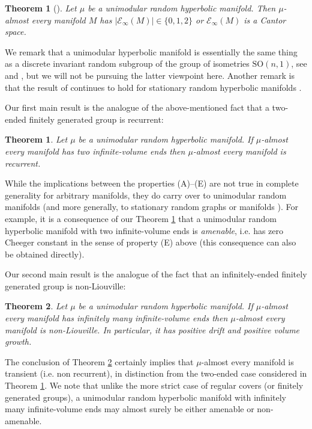 \documentclass{amsart}
\newcommand{\EndsInf}[1]{\mathcal{E}_{\infty}\left(#1\right)}
\theoremstyle{plain}
\newtheorem{theorem}{Theorem}[section]
\newtheorem*{theorem*}{Theorem}
\numberwithin{equation}{section}
\theoremstyle{definition}
\begin{document}
\begin{theorem*}[\cite{biringer2017ends}]
\label{thm:Biringer--Raimbault}
Let $\mu$ be a unimodular random hyperbolic manifold. Then $\mu$-almost every manifold $M$ has $|\EndsInf{M}| \in \{0,1,2\}$ or $\EndsInf{M}$ is a Cantor space.
\end{theorem*}

We remark that a unimodular hyperbolic manifold is essentially the same thing as a discrete invariant random subgroup of the group of isometries $\mathrm{SO}(n,1)$, see \cite[Theorem 1.4]{biringer2017unimodularity} and \cite[Theorem 2.8]{abert2022unimodular}, but we will not be pursuing the latter viewpoint here. Another remark is that the result of \cite{biringer2017ends} continues to hold for stationary random hyperbolic manifolds \cite{Kfir}. 

Our first main result is the  analogue of the above-mentioned fact that a two-ended finitely generated group is recurrent:
 
\begin{theorem}
\label{thm:main two ended}
Let $\mu$ be a unimodular random hyperbolic manifold. If $\mu$-almost every manifold has  two infinite-volume ends then $\mu$-almost every manifold is recurrent.
\end{theorem}

While the implications between the properties (A)--(E) are not true in complete generality for arbitrary manifolds, they do carry over to unimodular random manifolds (and more generally, to stationary random graphs \cite{benjamini2012ergodic} or manifolds \cite{lessa2016brownian}). For example, it is a consequence of our Theorem \ref{thm:main two ended} that a unimodular random hyperbolic manifold with two infinite-volume ends is \emph{amenable}, i.e. has zero Cheeger constant in the sense of property (E) above (this consequence can also be obtained directly). 

Our second main result is the analogue of the fact that an infinitely-ended finitely generated group is non-Liouville:

\begin{theorem}
\label{thm:main infinitely ended}
Let $\mu$ be a unimodular random hyperbolic manifold. If $\mu$-almost every manifold has infinitely many infinite-volume ends   then $\mu$-almost every manifold is non-Liouville. In particular, it has positive drift and positive volume growth.
\end{theorem}

The conclusion of Theorem \ref{thm:main infinitely ended} certainly implies that $\mu$-almost every manifold is transient (i.e. non recurrent), in distinction from the two-ended case considered in Theorem \ref{thm:main two ended}. We note that unlike the more strict case of regular covers (or finitely generated groups), a unimodular random hyperbolic manifold with infinitely many infinite-volume ends may almost surely be either amenable or non-amenable.
\end{document}
